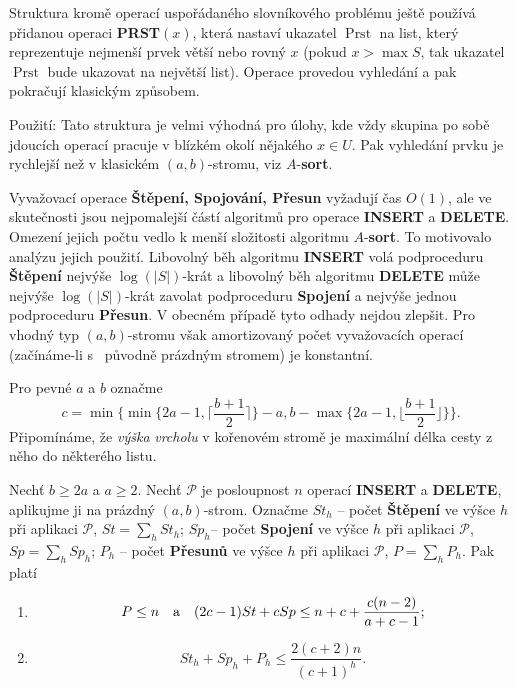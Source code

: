 \documentclass[a4paper,12pt]{article}
\DeclareMathOperator*{\Prst}{Prst}
\begin{document}
Struktura kromě operací uspořádaného 
slovníkového prob\-lé\-mu 
ještě používá přidanou ope\-raci {\bf PRST$(x)$}, která nastaví ukazatel 
$\Prst$ na list, který reprezentuje nejmenší prvek větší 
nebo rovný $x$ (pokud $x>\max S$, tak ukazatel $\Prst$ bude 
ukazovat na největší list). Operace provedou vyhledání a 
pak pokračují klasickým způsobem.

Použití: Tato struktura je velmi výhodná pro 
úlohy, kde vždy skupina po sobě jdoucích ope\-rací  
pracuje v blízkém okolí něja\-ké\-ho $x\in U$. Pak 
vyhledání prvku je rychlejší než v klasickém 
$(a,b)$-stromu, viz $A$-{\bf sort}.

Vyvažovací operace {\bf Štěpení, Spojování, Přesun }
vyžadují čas $O(1)$, ale ve skutečnosti jsou nejpomalejší 
částí 
algoritmů pro operace {\bf INSERT} a {\bf DELETE}.  Omezení 
jejich počtu vedlo k menší složitosti algoritmu $A$-{\bf sort}.  To motivovalo analýzu 
jejich použití.\newline 
Libovolný běh algoritmu {\bf INSERT }
volá podproceduru {\bf Štěpe\-ní} nejvýše $\log(|
S|)$-krát a libovolný běh 
algoritmu  {\bf DELETE} mů\-že nejvýše $\log(|S|
)$-krát zavolat podproceduru 
{\bf Spojení }
a nejvýše jednou podproceduru {\bf Přesun}.  V obecném 
případě tyto od\-ha\-dy nejdou zlepšit.  Pro vhodný typ 
$(a,b)$-stromu však amortizovaný počet vyvažovacích 
ope\-rací (začínáme-li s~ 
pů\-vod\-ně práz\-dným stromem) je konstantní.

Pro pevné $a$ a $b$ označme 
$$c=\min\{\min\{2a-1,\lceil\frac {b+1}2\rceil \}-a,b-\max\{2a-1,\lfloor\frac {
b+1}2\rfloor \}\}.$$
Připomínáme, že \emph{výška} \emph{vrcholu} v kořenovém stromě je 
maximální délka cesty z něho do některého listu.

\begin{veta}Nechť $b\ge 2a$ a $a\ge 2$. Nechť $\mathcal P$ je 
posloupnost $n$ operací {\bf INSERT} a {\bf DELETE}, aplikujme ji na 
prázdný $(a,b)$-strom. Označme\newline 
$St_h$ -- počet {\bf Štěpení} ve výšce $h$ při aplikaci $
\mathcal P$, $St=\sum_hSt_h$;\newline 
$Sp_h$-- počet {\bf Spojení} ve výšce $h$ při aplikaci $
\mathcal P$, 
$Sp=\sum_hSp_h$;\newline 
$P_h$ -- počet {\bf Přesunů} ve výšce $h$ při aplikaci $
\mathcal P$, 
$P=\sum_hP_h$.\newline 
Pak platí
\begin{enumerate}
\item
$$P\le n\quad \text{\rm a}\quad (2c-1)St+cSp\le n+c+\frac {c(n-2)}{a+c-1};$$
\item
$$St_h+Sp_h+P_h\le\frac {2(c+2)n}{(c+1)^h}.$$
\end{enumerate}
\end{veta}
\end{document}
